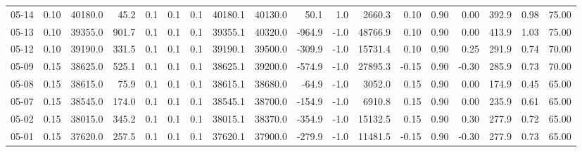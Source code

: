 \begin{threeparttable}
{\begin{tabular}{lrrrrrrrrrrrrrrrrr}
  05-14 &     0.10 & 40180.0 &              45.2 &               0.1 &                0.1 &                0.1 & 40180.1 & 40130.0 &       50.1 &                      1.0 &              2660.3 &       0.10 &      0.90 &           0.00 &            392.9 &            0.98 &                  75.00 \\
  05-13 &     0.10 & 39355.0 &             901.7 &               0.1 &                0.1 &                0.1 & 39355.1 & 40320.0 &     -964.9 &                     -1.0 &             48766.9 &       0.10 &      0.90 &           0.00 &            413.9 &            1.03 &                  75.00 \\
  05-12 &     0.10 & 39190.0 &             331.5 &               0.1 &                0.1 &                0.1 & 39190.1 & 39500.0 &     -309.9 &                     -1.0 &             15731.4 &       0.10 &      0.90 &           0.25 &            291.9 &            0.74 &                  70.00 \\
  05-09 &     0.15 & 38625.0 &             525.1 &               0.1 &                0.1 &                0.1 & 38625.1 & 39200.0 &     -574.9 &                     -1.0 &             27895.3 &      -0.15 &      0.90 &          -0.30 &            285.9 &            0.73 &                  70.00 \\
  05-08 &     0.15 & 38615.0 &              75.9 &               0.1 &                0.1 &                0.1 & 38615.1 & 38680.0 &      -64.9 &                     -1.0 &              3052.0 &       0.15 &      0.90 &           0.00 &            174.9 &            0.45 &                  65.00 \\
  05-07 &     0.15 & 38545.0 &             174.0 &               0.1 &                0.1 &                0.1 & 38545.1 & 38700.0 &     -154.9 &                     -1.0 &              6910.8 &       0.15 &      0.90 &           0.00 &            235.9 &            0.61 &                  65.00 \\
  05-02 &     0.15 & 38015.0 &             345.2 &               0.1 &                0.1 &                0.1 & 38015.1 & 38370.0 &     -354.9 &                     -1.0 &             15132.5 &       0.15 &      0.90 &           0.30 &            277.9 &            0.72 &                  65.00 \\
  05-01 &     0.15 & 37620.0 &             257.5 &               0.1 &                0.1 &                0.1 & 37620.1 & 37900.0 &     -279.9 &                     -1.0 &             11481.5 &      -0.15 &      0.90 &          -0.30 &            277.9 &            0.73 &                  65.00 \\

\end{tabular}}
\end{threeparttable}
